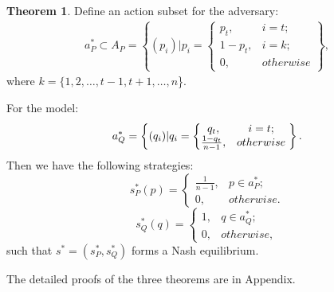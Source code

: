 \documentclass{article}
\theoremstyle{definition}
\newtheorem{theorem}{Theorem}
\begin{document}
\begin{theorem}
    Define an action subset for the adversary:
    \begin{align*}\nonumber
        a_P^* \subset A_P = \left\{ (p_i) |  p_i =
                                      \begin{cases}
                                        p_t, & i = t; \\
                                    	1-p_t, & i = k; \\
                                    	0, & otherwise
                                      \end{cases}
                                     \right\},
    \end{align*}
    where $k=\{1, 2, \dots,t-1, t+1, \dots, n$\}. 
    
    For the model:
    \begin{equation}\nonumber
        a_Q^* = \left\{(q_i) |  q_i =
                        \left\{\begin{matrix}
                                q_t, & i = t; \\ 
                                \frac{1-q_t}{n-1}, & otherwise
                        \end{matrix}\right.
                        \\
    \right\}.
    \end{equation}
    Then we have the following strategies: 
    \begin{equation}\nonumber
        s_P^*(p) =
                    \left\{\begin{matrix}
                            \frac{1}{n-1}, & p \in a_P^*; \\ 
                            0, & otherwise.
                    \end{matrix}\right.
    \end{equation}
    \begin{equation}\nonumber
        s_Q^*(q) =
                    \left\{\begin{matrix}
                            1, & q \in a_Q^*; \\ 
                            0, & otherwise,
                    \end{matrix}\right.
    \end{equation}
    such that $s^* = (s_P^*, s_Q^*)$ forms a Nash equilibrium.
    \label{the:theorem 3}
\end{theorem}
The detailed proofs of the three theorems are in Appendix.
\end{document}
